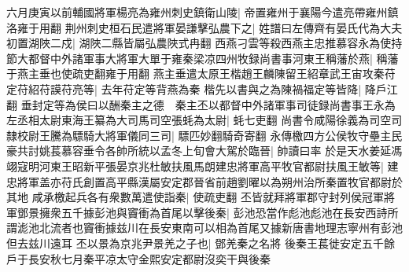 六月庚寅以前輔國將軍楊亮為雍州刺史鎮衛山陵|{
	帝置雍州于襄陽今遣亮帶雍州鎮洛雍于用翻}
荆州刺史桓石民遣將軍晏謙擊弘農下之|{
	姓譜曰左傳齊有晏氏代為大夫}
初置湖陜二戍|{
	湖陜二縣皆屬弘農陜式冉翻}
西燕刁雲等殺西燕主忠推慕容永為使持節大都督中外諸軍事大將軍大單于雍秦梁凉四州牧録尚書事河東王稱藩於燕|{
	稱藩于燕主垂也使疏吏翻雍于用翻}
燕主垂遣太原王楷趙王麟陳留王紹章武王宙攻秦苻定苻紹苻謨苻亮等|{
	去年苻定等背燕為秦}
楷先以書與之為陳禍福定等皆降|{
	降戶江翻}
垂封定等為侯曰以酬秦主之德　秦主丕以都督中外諸軍事司徒録尚書事王永為左丞相太尉東海王纂為大司馬司空張蚝為太尉|{
	蚝七吏翻}
尚書令咸陽徐義為司空司隸校尉王騰為驃騎大將軍儀同三司|{
	驃匹妙翻騎奇寄翻}
永傳檄四方公侯牧守壘主民豪共討姚萇慕容垂令各帥所統以孟冬上旬會大駕於臨晉|{
	帥讀曰率}
於是天水姜延馮翊寇明河東王昭新平張晏京兆杜敏扶風馬朗建忠將軍高平牧官都尉扶風王敏等|{
	建忠將軍盖亦苻氏創置高平縣漢屬安定郡晉省前趙劉曜以為朔州治所秦置牧官都尉於其地}
咸承檄起兵各有衆數萬遣使詣秦|{
	使疏吏翻}
丕皆就拜將軍郡守封列侯冠軍將軍鄧景擁衆五千據彭池與竇衝為首尾以擊後秦|{
	彭池恐當作彪池彪池在長安西詩所謂滮池北流者也竇衝據兹川在長安東南可以相為首尾又據新唐書地理志寧州有彭池但去兹川遠耳}
丕以景為京兆尹景羌之子也|{
	鄧羌秦之名將}
後秦王萇徙安定五千餘戶于長安秋七月秦平凉太守金熙安定都尉沒奕干與後秦

